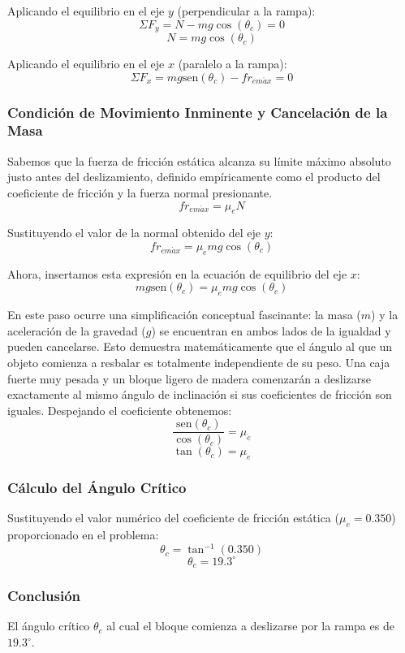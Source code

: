 \documentclass[12pt]{article}
\begin{document}
Aplicando el equilibrio en el eje $y$ (perpendicular a la rampa):
$$\Sigma F_y = N - mg\cos(\theta_c) = 0$$
$$N = mg\cos(\theta_c)$$

Aplicando el equilibrio en el eje $x$ (paralelo a la rampa):
$$\Sigma F_x = mg\text{sen}(\theta_c) - fr_{em\acute{a}x} = 0$$

\subsubsection*{Condición de Movimiento Inminente y Cancelación de la Masa}
Sabemos que la fuerza de fricción estática alcanza su límite máximo absoluto justo antes del deslizamiento, definido empíricamente como el producto del coeficiente de fricción y la fuerza normal presionante.
$$fr_{em\acute{a}x} = \mu_e N$$

Sustituyendo el valor de la normal obtenido del eje $y$:
$$fr_{em\acute{a}x} = \mu_e mg\cos(\theta_c)$$

Ahora, insertamos esta expresión en la ecuación de equilibrio del eje $x$:
$$mg\text{sen}(\theta_c) = \mu_e mg\cos(\theta_c)$$

En este paso ocurre una simplificación conceptual fascinante: la masa ($m$) y la aceleración de la gravedad ($g$) se encuentran en ambos lados de la igualdad y pueden cancelarse. Esto demuestra matemáticamente que el ángulo al que un objeto comienza a resbalar es totalmente independiente de su peso. Una caja fuerte muy pesada y un bloque ligero de madera comenzarán a deslizarse exactamente al mismo ángulo de inclinación si sus coeficientes de fricción son iguales.
Despejando el coeficiente obtenemos:
$$\frac{\text{sen}(\theta_c)}{\cos(\theta_c)} = \mu_e$$
$$\tan(\theta_c) = \mu_e$$

\subsubsection*{Cálculo del Ángulo Crítico}
Sustituyendo el valor numérico del coeficiente de fricción estática ($\mu_e = 0.350$) proporcionado en el problema:
$$\theta_c = \tan^{-1}(0.350)$$
$$\theta_c = 19.3^\circ$$

\subsubsection*{Conclusión}
El ángulo crítico $\theta_c$ al cual el bloque comienza a deslizarse por la rampa es de $19.3^\circ$.

\newpage
\end{document}
